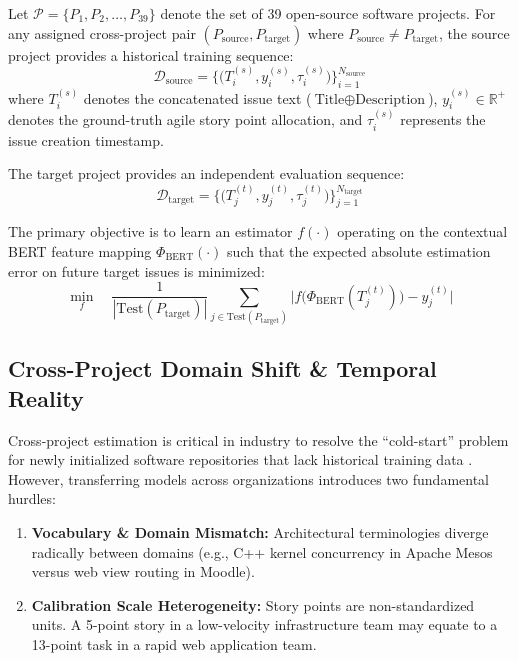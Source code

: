 \documentclass[11pt,a4paper]{article}
\begin{document}
Let $\mathcal{P} = \{P_1, P_2, \dots, P_{39}\}$ denote the set of 39 open-source software projects. For any assigned cross-project pair $(P_{\text{source}}, P_{\text{target}})$ where $P_{\text{source}} \neq P_{\text{target}}$, the source project provides a historical training sequence:
\begin{equation}
\mathcal{D}_{\text{source}} = \Big\{ \big(T_i^{(s)}, y_i^{(s)}, \tau_i^{(s)}\big) \Big\}_{i=1}^{N_{\text{source}}}
\end{equation}
where $T_i^{(s)}$ denotes the concatenated issue text ($\text{Title} \oplus \text{Description}$), $y_i^{(s)} \in \mathbb{R}^+$ denotes the ground-truth agile story point allocation, and $\tau_i^{(s)}$ represents the issue creation timestamp.

The target project provides an independent evaluation sequence:
\begin{equation}
\mathcal{D}_{\text{target}} = \Big\{ \big(T_j^{(t)}, y_j^{(t)}, \tau_j^{(t)}\big) \Big\}_{j=1}^{N_{\text{target}}}
\end{equation}

The primary objective is to learn an estimator $f(\cdot)$ operating on the contextual BERT feature mapping $\Phi_{\text{BERT}}(\cdot)$ such that the expected absolute estimation error on future target issues is minimized:
\begin{equation}
\min_{f} \quad \frac{1}{|\text{Test}(P_{\text{target}})|} \sum_{j \in \text{Test}(P_{\text{target}})} \Big| f\big(\Phi_{\text{BERT}}(T_j^{(t)})\big) - y_j^{(t)} \Big|
\end{equation}

\subsection{Cross-Project Domain Shift & Temporal Reality}
Cross-project estimation is critical in industry to resolve the ``cold-start'' problem for newly initialized software repositories that lack historical training data \cite{kocaguneli2012value}. However, transferring models across organizations introduces two fundamental hurdles:
\begin{enumerate}
    \item \textbf{Vocabulary & Domain Mismatch:} Architectural terminologies diverge radically between domains (e.g., C++ kernel concurrency in Apache Mesos versus web view routing in Moodle).
    \item \textbf{Calibration Scale Heterogeneity:} Story points are non-standardized units. A 5-point story in a low-velocity infrastructure team may equate to a 13-point task in a rapid web application team.
\end{enumerate}
\end{document}
